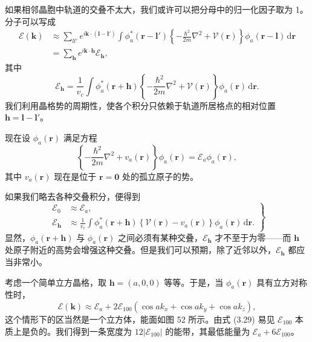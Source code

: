 如果相邻晶胞中轨道的交叠不太大，我们或许可以把分母中的归一化因子取为 1。分子可以写成
\begin{align*}
\mathcal{E}(\mathbf{k})&\approx\sum_{ll'}e^{i\mathbf{k}\cdot(\mathbf{l}-\mathbf{l}')}\int\phi_a^{*}(\mathbf{r}-\mathbf{l}')\left\{-\frac{\hbar^{2}}{2m}\nabla^{2}+\mathcal{V}(\mathbf{r})\right\}\phi_a(\mathbf{r}-\mathbf{l})\,\mathrm{d}\mathbf{r}\\
&=\sum_{\mathbf{h}}e^{i\mathbf{k}\cdot\mathbf{h}}\mathcal{E}_{\mathbf{h}},
\tag{3.26}
\end{align*}
其中
\begin{equation*}
\mathcal{E}_{\mathbf{h}}=\frac{1}{v_c}\int\phi_a^{*}(\mathbf{r}+\mathbf{h})\left\{-\frac{\hbar^{2}}{2m}\nabla^{2}+\mathcal{V}(\mathbf{r})\right\}\phi_a(\mathbf{r})\,\mathrm{d}\mathbf{r}.
\tag{3.27}
\end{equation*}
我们利用晶格势的周期性，使各个积分只依赖于轨道所居格点的相对位置 $\mathbf{h}=\mathbf{l}-\mathbf{l}'$。

现在设 $\phi_a(\mathbf{r})$ 满足方程
\begin{equation*}
\left\{-\frac{\hbar^{2}}{2m}\nabla^{2}+v_a(\mathbf{r})\right\}\phi_a(\mathbf{r})=\mathcal{E}_a\phi_a(\mathbf{r}),
\tag{3.28}
\end{equation*}
其中 $v_a(\mathbf{r})$ 现在是位于 $\mathbf{r}=\mathbf{0}$ 处的孤立原子的势。


如果我们略去各种交叠积分，便得到
\begin{equation*}
\left.\begin{aligned}
\mathcal{E}_{0}&\approx\mathcal{E}_a,\\
\mathcal{E}_{\mathbf{h}}&\approx\frac{1}{v_c}\int\phi_a^{*}(\mathbf{r}+\mathbf{h})\left\{\mathcal{V}(\mathbf{r})-v_a(\mathbf{r})\right\}\phi_a(\mathbf{r})\,\mathrm{d}\mathbf{r}.
\end{aligned}\right\}
\tag{3.29}
\end{equation*}
显然，$\phi_a(\mathbf{r}+\mathbf{h})$ 与 $\phi_a(\mathbf{r})$ 之间必须有某种交叠，$\mathcal{E}_{\mathbf{h}}$ 才不至于为零——而 $\mathbf{h}$ 处原子附近的高势会增强这种交叠。但是我们可以预期，除了近邻以外，$\mathcal{E}_{\mathbf{h}}$ 都应当非常小。

考虑一个简单立方晶格，取 $\mathbf{h}=(a,0,0)$ 等等。于是，当 $\phi_a(\mathbf{r})$ 具有立方对称性时，
\begin{equation*}
\mathcal{E}(\mathbf{k})\approx\mathcal{E}_a+2\mathcal{E}_{100}(\cos ak_x+\cos ak_y+\cos ak_z),
\tag{3.30}
\end{equation*}
这个情形下的区当然是一个立方体，能面如图 52 所示。由式 (3.29) 易见 $\mathcal{E}_{100}$ 本质上是负的。我们得到一条宽度为 $12|\mathcal{E}_{100}|$ 的能带，其最低能量为 $\mathcal{E}_a+6\mathcal{E}_{100}$。

